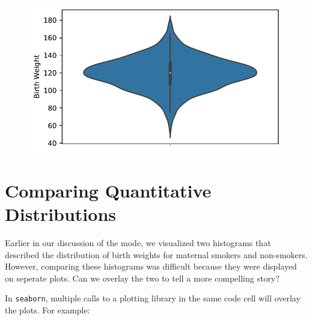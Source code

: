 \documentclass[
  letterpaper,
  DIV=11,
  numbers=noendperiod]{scrreprt}
\begin{document}
\begin{figure}[H]

{\centering \includegraphics{visualization_1/visualization_1_files/figure-pdf/cell-19-output-1.pdf}

}

\end{figure}

\hypertarget{comparing-quantitative-distributions}{%
\section{Comparing Quantitative
Distributions}\label{comparing-quantitative-distributions}}

Earlier in our discussion of the mode, we visualized two histograms that
described the distribution of birth weights for maternal smokers and
non-smokers. However, comparing these histograms was difficult because
they were displayed on seperate plots. Can we overlay the two to tell a
more compelling story?

In \texttt{seaborn}, multiple calls to a plotting library in the same
code cell will overlay the plots. For example:
\end{document}
